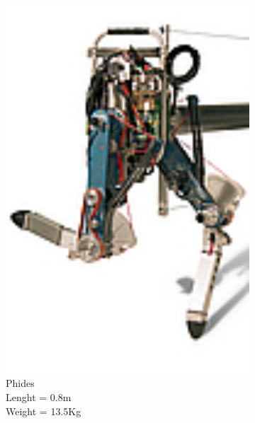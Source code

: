 \begin{figure}[h]
\begin{subfigure}{.22\textwidth}
    \includegraphics[width=0.9\linewidth]{figures/w_phides.pdf}
    \caption{Phides\\
    Lenght = 0.8m\\
    Weight = 13.5Kg}
    \label{fig:w_phides}
  \end{subfigure}
  \begin{subfigure}{.22\textwidth} 

\end{subfigure}
\end{figure}
